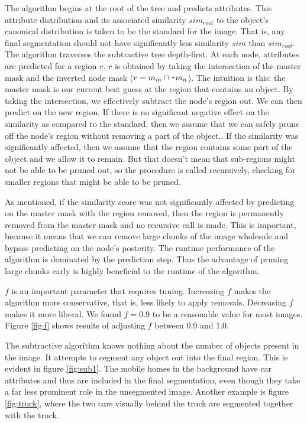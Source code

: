 \documentclass[10pt,twocolumn,letterpaper]{article}
\begin{document}
The algorithm begins at the root of the tree and predicts attributes.
This attribute distribution and its associated similarity $sim_{root}$
to the object's canonical distribution is taken to be
the standard for the image.  That is, any final segmentation should not have
significantly less similarity $sim$ than $sim_{root}$.  The algorithm traverses
the subtractive tree depth-first.  At each node, attributes are predicted for 
a region $r$.  
$r$ is obtained by taking the intersection of the master mask and the inverted
node mask ($r = m_{m} \cap \verb+~+ m_{n}$).  The intuition is this: the master mask is our current best guess at
the region that contains an object.  By taking the intersection, we effectively
subtract the node's region out.
We can then predict on the new region.  If 
there is no significant negative effect on the similarity as
compared to the standard, then we assume that we can safely prune off the node's
region without removing a part of the object..  If the
similarity was significantly affected, then we assume that the region
contains some part of the object and we allow it to remain.  But that 
doesn't mean that sub-regions might not be able to be pruned
out, so the procedure is called recursively, checking for smaller regions
that might be able to be pruned.

As mentioned, if the similarity score was not significantly affected by
predicting on the master mask with the region removed, then the region is
permanently removed from the master mask
and no recursive call is made.  This is important, because it means
that we can remove large chunks of the image wholesale and bypass predicting
on the node's posterity.
The runtime performance of the algorithm is dominated by the prediction step.
Thus the advantage of pruning large chunks early is highly beneficial to
the runtime of the algorithm.

$f$ is an important parameter that requires tuning.  Increasing $f$ makes the
algorithm more conservative, that is, less likely to apply removals.  Decreasing
$f$ makes it more liberal.  We found $f=0.9$ to be a reasonable value for most images.
Figure \ref{fig:f} shows results of adjusting $f$ between 0.9 and 1.0.

The subtractive algorithm knows nothing about the number of objects present
in the image.  It attempts to segment any object out into the final region.
This is evident in figure \ref{fig:sub1}.  The mobile homes in the background
have car attributes and thus are included in the final segmentation, even
though they take a far less prominent role in the unsegmented image.  Another
example is figure \ref{fig:truck}, where the two cars visually behind the truck
are segmented together with the truck.
\end{document}
